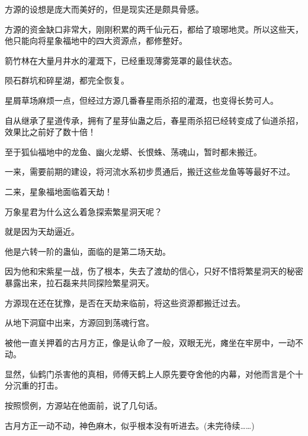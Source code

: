 \begin{this_body}
方源的设想是庞大而美好的，但是现实还是颇具骨感。

方源的资金缺口非常大，刚刚积累的两千仙元石，都给了琅琊地灵。所以这些天，他只能向将星象福地中的四大资源点，都修整好。

箭竹林在大量月井水的灌溉下，已经重现薄雾笼罩的最佳状态。

陨石群坑和碎星湖，都完全恢复。

星屑草场麻烦一点，但经过方源几番春星雨杀招的灌溉，也变得长势可人。

自从继承了星道传承，拥有了星芽仙蛊之后，春星雨杀招已经转变成了仙道杀招，效果比之前好了数十倍！

至于狐仙福地中的龙鱼、幽火龙蟒、长恨蛛、荡魂山，暂时都未搬迁。

一来，需要前期的建设，将河流水系初步贯通后，搬迁这些龙鱼等等最好不过。

二来，星象福地面临着天劫！

万象星君为什么这么着急探索繁星洞天呢？

就是因为天劫逼近。

他是六转一阶的蛊仙，面临的是第二场天劫。

因为他和宋紫星一战，伤了根本，失去了渡劫的信心，只好不惜将繁星洞天的秘密暴露出来，拉石磊来共同探险繁星洞天。

方源现在还在犹豫，是否在天劫来临前，将这些资源都搬迁过去。

从地下洞窟中出来，方源回到荡魂行宫。

被他一直关押着的古月方正，像是认命了一般，双眼无光，瘫坐在牢房中，一动不动。

显然，仙鹤门杀害他的真相，师傅天鹤上人原先要夺舍他的内幕，对他而言是个十分沉重的打击。

按照惯例，方源站在他面前，说了几句话。

古月方正一动不动，神色麻木，似乎根本没有听进去。(未完待续……)

\end{this_body}


